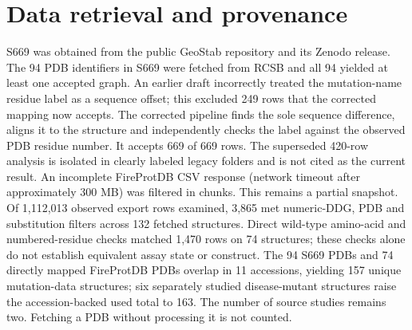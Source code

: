 \documentclass[11pt]{article}
\begin{document}
\section{Data retrieval and provenance}
S669 was obtained from the public GeoStab repository and its Zenodo release. The 94 PDB identifiers in S669 were fetched from RCSB and all 94 yielded at least one accepted graph. An earlier draft incorrectly treated the mutation-name residue label as a sequence offset; this excluded 249 rows that the corrected mapping now accepts. The corrected pipeline finds the sole sequence difference, aligns it to the structure and independently checks the label against the observed PDB residue number. It accepts 669 of 669 rows. The superseded 420-row analysis is isolated in clearly labeled legacy folders and is not cited as the current result. An incomplete FireProtDB CSV response (network timeout after approximately 300 MB) was filtered in chunks. This remains a partial snapshot. Of 1,112,013 observed export rows examined, 3,865 met numeric-DDG, PDB and substitution filters across 132 fetched structures. Direct wild-type amino-acid and numbered-residue checks matched 1,470 rows on 74 structures; these checks alone do not establish equivalent assay state or construct. The 94 S669 PDBs and 74 directly mapped FireProtDB PDBs overlap in 11 accessions, yielding 157 unique mutation-data structures; six separately studied disease-mutant structures raise the accession-backed used total to 163. The number of source studies remains two. Fetching a PDB without processing it is not counted.
\end{document}
